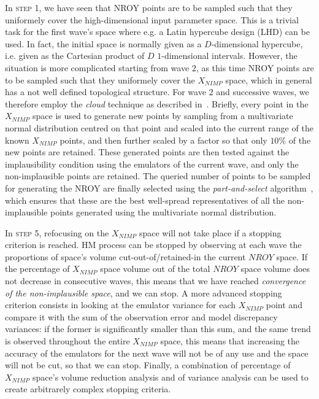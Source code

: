 \vspace{0.2cm}
In \textsc{step 1}, we have seen that NROY points are to be sampled such that they uniformely cover the high-dimensional input parameter space. This is a trivial task for the first wave's space where e.g. a Latin hypercube design (\acs{LHD})  can be used. In fact, the initial space is normally given as a $D$-dimensional hypercube, i.e. given as the Cartesian product of $D$ $1$-dimensional intervals. However, the situation is more complicated starting from wave $2$, as this time NROY points are to be sampled such that they uniformely cover the $X_{NIMP}$ space, which in general has a not well defined topological structure. For wave $2$ and successive waves, we therefore employ the \textit{cloud} technique as described in~\cite{Coveney:2018}. Briefly, every point in the $X_{NIMP}$ space is used to generate new points by sampling from a multivariate normal distribution centred on that point and scaled into the current range of the known $X_{NIMP}$ points, and then further scaled by a factor so that only $10\%$ of the new points are retained. These generated points are then tested against the implausibility condition using the emulators of the current wave, and only the non-implausible points are retained. The queried number of points to be sampled for generating the NROY are finally selected using the \textit{part-and-select} algorithm~\cite{Salomon:2013}, which ensures that these are the best well-spread representatives of all the non-implausible points generated using the multivariate normal distribution. 

\vspace{0.2cm}
In \textsc{step 5}, refocusing on the $X_{NIMP}$ space will not take place if a stopping criterion is reached. HM process can be stopped by observing at each wave the proportions of space's volume cut-out-of/retained-in the current $NROY$ space. If the percentage of $X_{NIMP}$ space volume out of the total $NROY$ space volume does not decrease in consecutive waves, this means that we have reached \textit{convergence of the non-implausible space}, and we can stop. A more advanced stopping criterion consists in looking at the emulator variance for each $X_{NIMP}$ point and compare it with the sum of the observation error and model discrepancy variances: if the former is significantly smaller than this sum, and the same trend is observed throughout the entire $X_{NIMP}$ space, this means that increasing the accuracy of the emulators for the next wave will not be of any use and the space will not be cut, so that we can stop. Finally, a combination of percentage of $X_{NIMP}$ space's volume reduction analysis and of variance analysis can be used to create arbitrarely complex stopping criteria.




